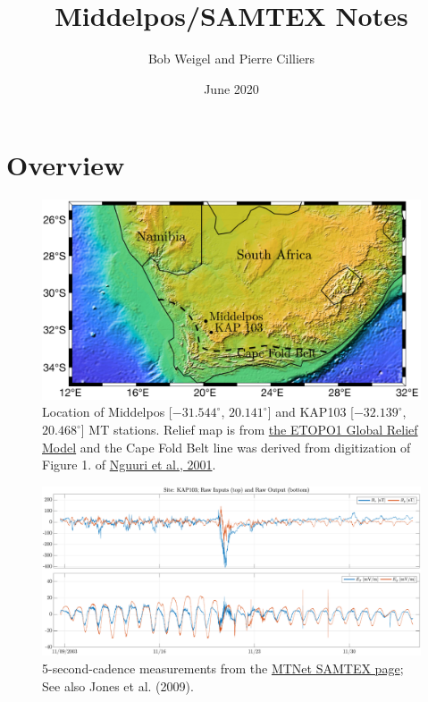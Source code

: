 \documentclass{article}
\title{Middelpos/SAMTEX Notes}
\author{Bob Weigel and Pierre Cilliers}
\date{June 2020}
\begin{document}
\section{Overview}


\begin{figure}[h!]
\centering
\includegraphics[width=\textwidth]{figures/map.pdf}
\caption{Location of Middelpos [$-31.544^\circ$, $20.141^\circ$] and KAP103 [$-32.139^\circ$, $20.468^\circ$] MT stations. Relief map is from \href{http://ngdc.noaa.gov/mgg/global/global.html}{the ETOPO1 Global Relief Model} and the Cape Fold Belt line was derived from digitization of Figure 1. of \href{https://agupubs.onlinelibrary.wiley.com/doi/pdf/10.1029/2000GL012587}{Nguuri et al., 2001}.}
\label{fig:map}
\end{figure}

\begin{figure}[h!]
\centering
\includegraphics[width=\textwidth]{figures/KAP103/timeseries.pdf}
\caption{5-second-cadence measurements from the \href{https://www.mtnet.info/data/samtex/samtex.html}{MTNet SAMTEX page}; See also Jones et al. (2009).}
\label{fig:KAP103_timeseries}
\end{figure}
\end{document}

